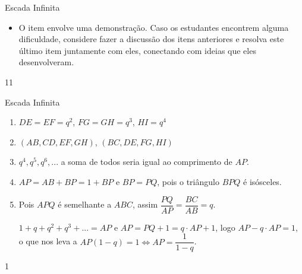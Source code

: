 \begin{sugestions}{Escada Infinita}
{
\begin{itemize}
\item O item  envolve uma demonstração. Caso os estudantes encontrem alguma dificuldade, considere fazer a discussão dos itens anteriores e resolva este último item juntamente com eles, conectando com ideias que eles desenvolveram.

\end{itemize}
}{1}{1}
\end{sugestions}
\begin{answer}{Escada Infinita}
{
\begin{enumerate}
\item $DE=EF=q^2$, $FG=GH=q^3$, $HI=q^4$
\item $(AB, CD, EF, GH)$, $(BC, DE, FG, HI)$
\item $q^4, q^5, q^6,... $ a soma de todos seria igual ao comprimento de $AP$.
\item $AP=AB+BP=1+BP$ e $BP=PQ$, pois o triângulo $BPQ$ é isósceles.
\item Pois $APQ$ é semelhante a $ABC$, assim $\dfrac{PQ}{AP}=\dfrac{BC}{AB}=q$.

$ 1+q+q^2+q^3+...= AP $ e $AP= PQ+1 = q\cdot AP +1$, logo $AP-q\cdot AP=1$, o que nos leva a $AP(1-q)=1 \iff AP=\dfrac 1{1-q}$.
\end{enumerate}
}{1}
\end{answer}


